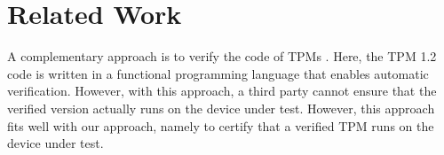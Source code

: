 
\chapter{Related Work}\label{chapter:related_work}



A complementary approach is to verify the code of TPMs \cite{Mukhamedov2013}. Here, the TPM 1.2 code is written in a functional programming language that enables automatic verification. However, with this approach, a third party cannot ensure that the verified version actually runs on the device under test. However, this approach fits well with our approach, namely to certify that a verified TPM runs on the device under test.
